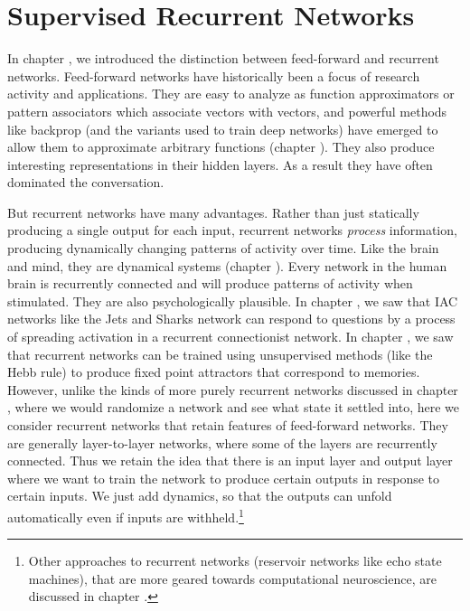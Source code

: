 \chapter{Supervised Recurrent Networks}\label{ch_supervised_recurrent}

In chapter , we introduced the distinction between feed-forward and recurrent networks. Feed-forward networks have historically been a focus of research activity and applications. They are easy to analyze as function approximators or pattern associators which  associate vectors with vectors, and powerful methods like backprop (and the variants used to train deep networks) have emerged to allow them to approximate arbitrary functions (chapter ). They also produce interesting representations in their hidden layers. As a result they have often dominated the conversation.

But recurrent networks have many advantages. Rather than just statically producing a single output for each input, recurrent networks \emph{process} information, producing dynamically changing patterns of activity over time. Like the brain and mind, they are dynamical systems (chapter ). Every network in the human brain is recurrently connected and will produce patterns of activity when stimulated. They are also psychologically plausible. In chapter , we saw that IAC networks like the Jets and Sharks network can respond to questions by a process of spreading activation in a recurrent connectionist network. In chapter , we saw that recurrent networks can be trained using unsupervised methods (like the Hebb rule) to produce fixed point attractors that correspond to memories. However, unlike the kinds of more purely recurrent networks discussed in chapter , where we would randomize a network and see what state it settled into, here we consider recurrent networks that retain features of feed-forward networks. They are generally layer-to-layer networks, where some of the layers are recurrently connected. Thus we retain the idea that there is an input layer and output layer where we want to train the network to produce certain outputs in response to certain inputs.  We just add dynamics, so that the outputs can unfold automatically even if inputs are withheld.\footnote{Other approaches to recurrent networks (reservoir networks like echo state machines), that are more geared towards computational neuroscience, are discussed in chapter .}

